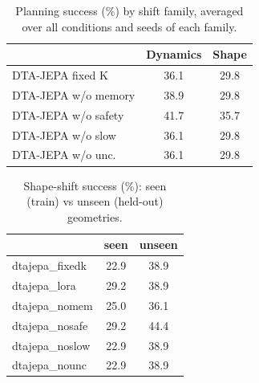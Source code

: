 \begin{table}[t]
\centering
\caption{Planning success (\%) by shift family, averaged over all conditions and seeds of each family.}
\label{tab:family}
\begin{tabular}{lcc}
\toprule
 & Dynamics & Shape \\
\midrule
DTA-JEPA fixed K & 36.1 & 29.8 \\
DTA-JEPA w/o memory & 38.9 & 29.8 \\
DTA-JEPA w/o safety & 41.7 & 35.7 \\
DTA-JEPA w/o slow & 36.1 & 29.8 \\
DTA-JEPA w/o unc. & 36.1 & 29.8 \\
\bottomrule
\end{tabular}
\end{table}

\begin{table}[t]
\centering
\caption{Shape-shift success (\%): seen (train) vs unseen (held-out) geometries.}
\label{tab:seenunseen}
\begin{tabular}{lcc}
\toprule
 & seen & unseen \\
\midrule
dtajepa_fixedk & 22.9 & 38.9 \\
dtajepa_lora & 29.2 & 38.9 \\
dtajepa_nomem & 25.0 & 36.1 \\
dtajepa_nosafe & 29.2 & 44.4 \\
dtajepa_noslow & 22.9 & 38.9 \\
dtajepa_nounc & 22.9 & 38.9 \\
\bottomrule
\end{tabular}
\end{table}
